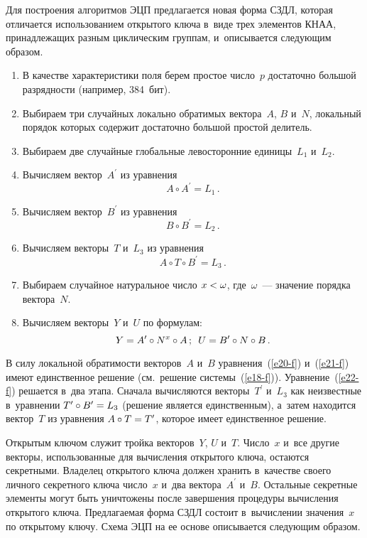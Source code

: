 \begin{multicols}{2}
  Для построения алгоритмов ЭЦП 
предлагается новая форма СЗДЛ, которая отличается использованием 
открытого ключа в~виде трех элементов КНАА, принадлежащих разным 
циклическим группам, и~описывается следующим образом. 
  \begin{enumerate}[1.]
  \item В качестве характеристики поля берем простое число~$p$ достаточно 
большой разрядности (например, 384~бит). 
  \item Выбираем три случайных локально обратимых вектора~$A$, $B$ 
и~$N$, локальный порядок которых содержит достаточно большой простой 
делитель.
  \item  Выбираем две случайные глобальные левосторонние единицы~$L_1$ 
и~$L_2$.
  \item  Вычисляем вектор~$A^\prime$ из уравнения 
  \begin{equation}
  A\circ A^\prime =L_1\,.
  \label{e20-f}
  \end{equation}
  \item Вычисляем вектор~$B^\prime$ из уравнения 
  \begin{equation}
  B\circ B^\prime =L_2\,.
  \label{e21-f}
  \end{equation}
  \item Вычисляем векторы~$T$ и~$L_3$ из уравнения 
  \begin{equation}
  A\circ T\circ B^\prime =L_3\,.
  \label{e22-f}
  \end{equation}
  \item Выбираем случайное натуральное число $x\hm<\omega$, 
где~$\omega$~--- значение порядка вектора~$N$.
  \item Вычисляем векторы~$Y$ и~$U$ по формулам:
  $$
  Y=A^\prime \circ N^x\circ A\,;\enskip U=B^\prime\circ N\circ B\,.
  $$
  \end{enumerate}
  
  В силу локальной обратимости векторов~$A$ и~$B$ уравнения~(\ref{e20-f}) 
и~(\ref{e21-f}) имеют единственное решение (см.\ решение  
системы~(\ref{e18-f})). Уравнение~(\ref{e22-f}) решается в~два этапа. Сначала 
вычисляются векторы~$T^\prime$ и~$L_3$ как неизвестные в~уравнении 
$T^\prime\circ B^\prime \hm=L_3$ (решение является единственным), а~затем 
находится вектор~$T$ из уравнения $A\circ T\hm= T^\prime$, которое имеет 
единственное решение.
  
  Открытым ключом служит тройка векторов~$Y$, $U$ и~$T$. Число~$x$ 
и~все другие векторы, использованные для вычисления открытого ключа, 
остаются секретными. Владелец открытого ключа должен хранить в~качестве 
своего личного секретного ключа число~$x$ и~два вектора~$A^\prime$ и~$B$. 
Остальные секретные элементы могут быть уничтожены после завершения 
процедуры вычисления открытого ключа. Предлагаемая форма СЗДЛ состоит 
в~вычислении значения~$x$ по открытому ключу. Схема ЭЦП на ее основе 
описывается следующим образом. 


\end{multicols}
